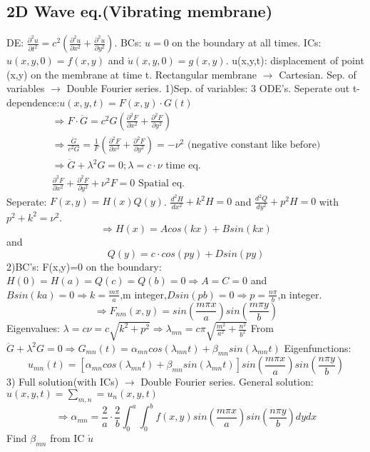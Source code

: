 \documentclass[10pt,a4paper]{article}
\begin{document}
\begin{multicols}{2}
\subsection*{2D Wave eq.(Vibrating membrane)}
DE: $\frac{\partial^{2}u}{\partial t^{2}}=c^{2}\left(\frac{\partial^{2}u}{\partial x^{2}} + \frac{\partial^{2}u}{\partial y^{2}}\right)$. BCs: $u=0$ on the boundary at all times. ICs: $u(x,y,0)=f(x,y)$ and $\dot u(x,y,0)=g(x,y)$. u(x,y,t): displacement of point (x,y) on the membrane at time t. Rectangular membrane $\rightarrow$ Cartesian. Sep. of variables $\rightarrow$ Double Fourier series.
1)Sep. of variables: 3 ODE's.
Seperate out t-dependence:$u(x,y,t)=F(x,y)\cdot G(t)$ 
\begin{align*}
\Rightarrow F\cdot \ddot G = c^{2}G\left(\frac{\partial^{2}F}{\partial x^{2}}+\frac{\partial^{2}F}{\partial y^{2}}\right) \\
\Rightarrow \frac{\ddot G}{c^{2}G} = \frac{1}{F}\left(\frac{\partial^{2}F}{\partial x^{2}}+\frac{\partial^{2}F}{\partial y^{2}}\right) = -\nu^{2} \text{ (negative constant like before)} \\
\Rightarrow \ddot G + \lambda^{2}G=0; \lambda=c\cdot \nu \text{ time eq.} \\
\frac{\partial^{2}F}{\partial x^{2}}+\frac{\partial^{2}F}{\partial y^{2}} + \nu^{2}F = 0 \text{ Spatial eq.}
\end{align*}
Seperate: $F(x,y)=H(x)Q(y)$. \(\frac{d^{2}H}{dx^{2}} + k^{2}H = 0\) and \(\frac{d^{2}Q}{dy^{2}} + p^{2}H = 0\) with \(p^{2}+k^{2}=\nu^{2}\). \[\Rightarrow H(x) = Acos(kx) + Bsin(kx)\] and \[Q(y) = c\cdot cos(py) + Dsin(py)\]
2)BC's: F(x,y)=0 on the boundary: $H(0)=H(a)=Q(c)=Q(b)=0 \Rightarrow A=C=0$ and $Bsin(ka)=0\Rightarrow k=\frac{m\pi}{a}$,m integer,$Dsin(pb)=0\Rightarrow p=\frac{n\pi}{b}$,n integer. \[\Rightarrow F_{nm}(x,y)=sin(\frac{m\pi x}{a})sin(\frac{m\pi y}{b})\]
Eigenvalues: $\lambda=c\nu=c\sqrt{k^{2}+p^{2}}\Rightarrow \lambda_{mn}=c\pi\sqrt{\frac{m^{2}}{a^{2}}+\frac{n^{2}}{b^{2}}}$
From $\ddot G+\lambda^{2}G=0 \Rightarrow G_{mn}(t)=\alpha_{mn}cos(\lambda_{mn}t)+\beta_{mn}sin(\lambda_{mn}t)$ Eigenfunctions:\[u_{mn}(t)=\left[\alpha_{mn}cos(\lambda_{mn}t)+\beta_{mn}sin(\lambda_{mn}t)\right]sin(\frac{m\pi x}{a})sin(\frac{n\pi y}{b})\]
3) Full solution(with ICs) $\rightarrow$ Double Fourier series.
General solution: \(u(x,y,t)=\sum_{m,n}=u_{n}(x,y,t)\)
\[\Rightarrow \alpha_{mn}=\frac{2}{a}\cdot \frac{2}{b}\int_{0}^{a}\int_{0}^{b}f(x,y)sin(\frac{m\pi x}{a})sin(\frac{n\pi y}{b})dydx\] Find $\beta_{mn}$ from IC $\dot u$




\end{multicols}
\end{document}

